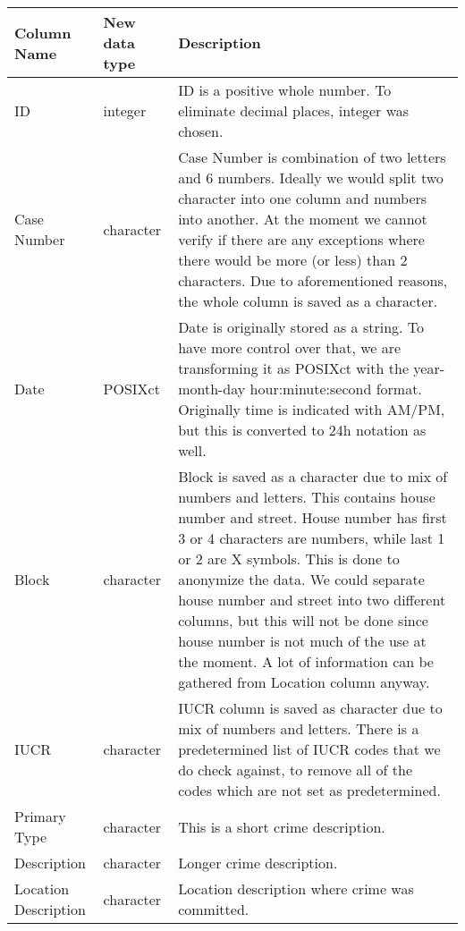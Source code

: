 \begin{center}
    \begin{longtable}{|m{6em}|m{7em}|m{18em}|}
        \hline
            Column Name & 
            New data type & 
            Description\\
        \hline
            ID & 
            integer &
            ID is a positive whole number. To eliminate decimal places, integer was chosen.\\
        \hline
            Case Number & 
            character &
            Case Number is combination of two letters and 6 numbers. Ideally we would split two character into one column and numbers into another. At the moment we cannot verify if there are any exceptions where there would be more (or less) than 2 characters. Due to aforementioned reasons, the whole column is saved as a character. \\
        \hline
            Date & 
            POSIXct & 
            Date is originally stored as a string. To have more control over that, we are transforming it as POSIXct with the year-month-day hour:minute:second format. Originally time is indicated with AM/PM, but this is converted to 24h notation as well.\\
        \hline
            Block & 
            character & 
            Block is saved as a character due to mix of numbers and letters. This contains house number and street. House number has first 3 or 4 characters are numbers, while last 1 or 2 are X symbols. This is done to anonymize the data. We could separate house number and street into two different columns, but this will not be done since house number is not much of the use at the moment. A lot of information can be gathered from Location column anyway.\\
        \hline
            IUCR & 
            character & 
            IUCR column is saved as character due to mix of numbers and letters. There is a predetermined list of IUCR codes that we do check against, to remove all of the codes which are not set as predetermined.\\
        \hline
            Primary Type & 
            character & 
            This is a short crime description. \\
        \hline
            Description & 
            character & 
            Longer crime description.\\
        \hline
            Location Description & 
            character & 
            Location description where crime was committed.\\

\end{longtable}
\end{center}

